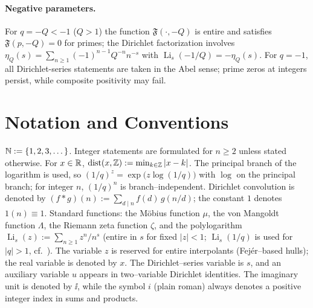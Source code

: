 \paragraph{Negative parameters.}
For \(q=-Q<-1\) (\(Q>1\)) the function \(\mathfrak F(\cdot,-Q)\) is entire and satisfies \(\mathfrak F(p,-Q)=0\) for primes;
the Dirichlet factorization involves \(\eta_Q(s)=\sum_{n\ge1}(-1)^{n-1}Q^{-n}n^{-s}\) with \(\operatorname{Li}_s(-1/Q)=-\eta_Q(s)\).
For \(q=-1\), all Dirichlet-series statements are taken in the Abel sense; prime zeros at integers persist, while composite positivity may fail.

\medskip

\section*{Notation and Conventions}\label{app:notation}
$\mathbb{N}:=\{1,2,3,\dots\}$. Integer statements are formulated for $n\ge2$ unless stated otherwise. For $x\in\mathbb{R}$,
$\operatorname{dist}(x,\mathbb{Z}):=\min_{k\in\mathbb{Z}}|x-k|$.
The principal branch of the logarithm is used, so $(1/q)^z=\exp\bigl(z\log(1/q)\bigr)$ with $\log$ on the principal branch; for integer $n$, $(1/q)^n$ is branch–independent.
Dirichlet convolution is denoted by $(f*g)(n):=\sum_{d\mid n} f(d)\,g(n/d)$; the constant $1$ denotes $1(n)\equiv 1$.
Standard functions: the Möbius function $\mu$, the von Mangoldt function $\Lambda$, the Riemann zeta function $\zeta$, and the polylogarithm
$\operatorname{Li}_s(z):=\sum_{n\ge1} z^n/n^s$ (entire in $s$ for fixed $|z|<1$; $\operatorname{Li}_s(1/q)$ is used for $|q|>1$, cf.\ \cite{dlmf,lewin1981}).
The variable $z$ is reserved for entire interpolants (Fej\'er–based hulls); the real variable is denoted by $x$. The Dirichlet–series variable is $s$, and an auxiliary variable $u$ appears in two–variable Dirichlet identities. The imaginary unit is denoted by $\ii$, while the symbol $i$ (plain roman) always denotes a positive integer index in sums and products.

